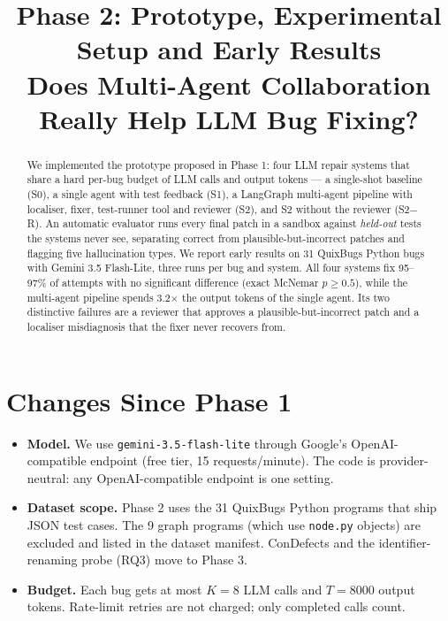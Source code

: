 \documentclass[conference]{IEEEtran}
\begin{document}
\title{Phase 2: Prototype, Experimental Setup and Early Results\\
Does Multi-Agent Collaboration Really Help LLM Bug Fixing?}

\author{
\and
{}
\and
{}
}

\maketitle

\begin{abstract}
We implemented the prototype proposed in Phase 1: four LLM repair systems that
share a hard per-bug budget of LLM calls and output tokens --- a single-shot
baseline (S0), a single agent with test feedback (S1), a LangGraph multi-agent
pipeline with localiser, fixer, test-runner tool and reviewer (S2), and S2
without the reviewer (S2$-$R). An automatic evaluator runs every final patch in
a sandbox against \emph{held-out} tests the systems never see, separating
correct from plausible-but-incorrect patches and flagging five hallucination
types. We report early results on 31 QuixBugs Python bugs with Gemini 3.5
Flash-Lite, three runs per bug and system. All four systems fix 95--97\% of attempts with no significant difference (exact McNemar $p\geq0.5$), while the multi-agent pipeline spends 3.2$\times$ the output tokens of the single agent. Its two distinctive failures are a reviewer that approves a plausible-but-incorrect patch and a localiser misdiagnosis that the fixer never recovers from.
\end{abstract}

\section{Changes Since Phase 1}
\begin{itemize}
\item \textbf{Model.} We use \texttt{gemini-3.5-flash-lite} through Google's
OpenAI-compatible endpoint (free tier, 15 requests/minute). The code is
provider-neutral: any OpenAI-compatible endpoint is one setting.
\item \textbf{Dataset scope.} Phase 2 uses the 31 QuixBugs Python programs that
ship JSON test cases. The 9 graph programs (which use \texttt{node.py}
objects) are excluded and listed in the dataset manifest. ConDefects and the
identifier-renaming probe (RQ3) move to Phase 3.
\item \textbf{Budget.} Each bug gets at most $K=8$ LLM calls and $T=8000$
output tokens. Rate-limit retries are not charged; only completed calls count.
\end{itemize}
\end{document}

